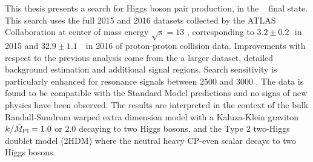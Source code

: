This thesis presents a search for Higgs boson pair production, in the \bbbb~ final state. 
This search uses the full 2015 and 2016 datasets collected by the ATLAS Collaboration at center of mass energy $\sqrt{s}=13$ \TeV, corresponding to $3.2 \pm 0.2$\,\ifb\ in 2015 and $32.9 \pm 1.1$\, \ifb\ in 2016 of proton-proton collision data.
Improvements with respect to the previous analysis come from the a larger dataset, detailed background estimation and additional signal regions.
Search sensitivity is particularly enhanced for resonance signals between $2500$ \GeV and $3000$ \GeV.
The data is found to be compatible with the Standard Model predictions and no signs of new physics have been observed.
The results are interpreted in the context of the bulk Randall-Sundrum warped extra dimension model with a Kaluza-Klein graviton $k/\bar{M}_{\rm Pl} = 1.0$ or $2.0$ decaying to two Higgs bosons, and the Type 2 two-Higgs doublet model (2HDM) where the neutral heavy CP-even scalar decays to two Higgs bosons.